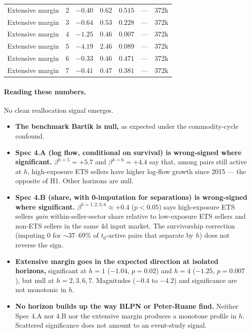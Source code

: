 \documentclass[11pt]{article}
\begin{document}
\begin{center}
\begin{tabular}{lrrrrrr}
Extensive margin                     & $2$ & $-0.40$ & $0.62$ & $0.515$ & --- & 372k \\
Extensive margin                     & $3$ & $-0.64$ & $0.53$ & $0.228$ & --- & 372k \\
Extensive margin                     & $4$ & $\mathbf{-1.25}$ & $0.46$ & $\mathbf{0.007}$ & --- & 372k \\
Extensive margin                     & $5$ & $-4.19$ & $2.46$ & $0.089$ & --- & 372k \\
Extensive margin                     & $6$ & $-0.33$ & $0.46$ & $0.471$ & --- & 372k \\
Extensive margin                     & $7$ & $-0.41$ & $0.47$ & $0.381$ & --- & 372k \\
\bottomrule
\end{tabular}
\end{center}

\paragraph{Reading these numbers.} No clean reallocation signal emerges.

\begin{itemize}
  \item \textbf{The benchmark Bartik is null,} as expected under the commodity-cycle confound.
  \item \textbf{Spec 4.A (log flow, conditional on survival) is wrong-signed where significant.} $\beta^{h=5}=+5.7$ and $\beta^{h=6}=+4.4$ say that, among pairs still active at $h$, high-exposure ETS sellers have higher log-flow growth since 2015 --- the opposite of H1. Other horizons are null.
  \item \textbf{Spec 4.B (share, with 0-imputation for separations) is wrong-signed where significant.} $\beta^{h=1,2,3,6} \approx +0.4$ ($p<0.05$) says high-exposure ETS sellers \emph{gain} within-seller-sector share relative to low-exposure ETS sellers and non-ETS sellers in the same 4d input market. The survivorship correction (imputing $0$ for $\sim 37$--$69\%$ of $t_0$-active pairs that separate by $h$) does not reverse the sign.
  \item \textbf{Extensive margin goes in the expected direction at isolated horizons,} significant at $h=1$ ($-1.04$, $p=0.02$) and $h=4$ ($-1.25$, $p=0.007$), but null at $h=2,3,6,7$. Magnitudes ($-0.4$ to $-4.2$) and significance are not monotonic in $h$.
  \item \textbf{No horizon builds up the way BLPN or Peter-Ruane find.} Neither Spec 4.A nor 4.B nor the extensive margin produces a monotone profile in $h$. Scattered significance does not amount to an event-study signal.
\end{itemize}
\end{document}
